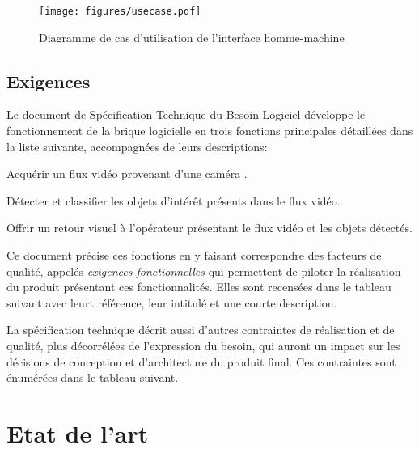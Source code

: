 			\begin{figure}[h]
			{
				\centering
				\texttt{[image: figures/usecase.pdf]}
				\caption{Diagramme de cas d'utilisation de l'interface homme-machine}
				\label{fig:usecase}
			}
			\end{figure}



		\subsection{Exigences}

			Le document de Spécification Technique du Besoin Logiciel développe le fonctionnement de la brique logicielle en trois fonctions principales détaillées dans la liste suivante, accompagnées de leurs descriptions:
			\begin{description}[noitemsep, before={\setcounter{descriptcount}{0}},font=\bfseries\stepcounter{descriptcount}\thedescriptcount.~]
				\item[Acquisition Vidéo:] Acquérir un flux vidéo provenant d’une caméra \degre.
				\item[Détection:] Détecter et classifier les objets d’intérêt présents dans le flux vidéo.
				\item[Retour visuel:] Offrir un retour visuel à l’opérateur présentant le flux vidéo et les objets détectés.
			\end{description}
			Ce document précise ces fonctions en y faisant correspondre des facteurs de qualité, appelés \emph{exigences fonctionnelles} qui permettent de piloter la réalisation du produit présentant ces fonctionnalités. Elles sont recensées dans le tableau suivant avec leurt référence, leur intitulé et une courte description.
			
			
			
			La spécification technique décrit aussi d'autres contraintes de réalisation et de qualité, plus décorrélées de l'expression du besoin, qui auront un impact sur les décisions de conception et d'architecture du produit final. Ces contraintes sont énumérées dans le tableau suivant.
			
			
			

	\section{Etat de l'art}

